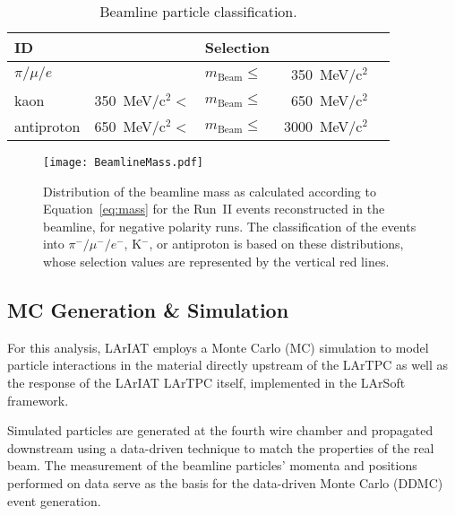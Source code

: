 \documentclass[%
 floatfix,
 reprint,
 twocolumn,
superscriptaddress,
showpacs,preprintnumbers,
 amsmath,amssymb,
 aps,
prd,
]{revtex4-1}
\begin{document}
\begin{table}
\caption{\label{tab:Mass} Beamline particle classification.}
\begin{ruledtabular}
\begin{tabular}{|l|llrl|}
ID&  &Selection &  &\\
\hline
 $\pi/\mu/e$ &                               & $m_{\text{Beam}}\leq$& 350~MeV/c$^2$&\\
 kaon           & 350~MeV/c$^2 <$ & $m_{\text{Beam}}\leq$& 650~MeV/c$^2$&\\
 antiproton   & 650~MeV/c$^2 <$ & $m_{\text{Beam}}\leq$& 3000~MeV/c$^2$&\\
\end{tabular}
\end{ruledtabular}
\end{table}

\begin{figure}
  \centering  
\texttt{[image: BeamlineMass.pdf]}
\caption{Distribution of the beamline mass as calculated according to Equation~\ref{eq:mass} for the Run~II events reconstructed in the beamline, for negative polarity runs. The classification of the events into $\pi^-/ \mu^-/e^-$, K$^-$, or antiproton is based on these distributions, whose selection values are represented by the vertical red lines.}
\label{fig:mass}
\end{figure}


\subsection{\label{sec:Sim} MC Generation \& Simulation}
For this analysis, LArIAT employs a Monte Carlo (MC) simulation
to model particle interactions in the material directly upstream of the LArTPC as well as the response of the LArIAT LArTPC itself, implemented in the LArSoft framework. 

Simulated particles are generated at the fourth wire chamber and propagated downstream using a data-driven technique to match the properties of the real beam. The measurement of the beamline particles’ momenta and positions performed on data serve as the basis for the data-driven Monte Carlo (DDMC) event generation.

 
\end{document}
